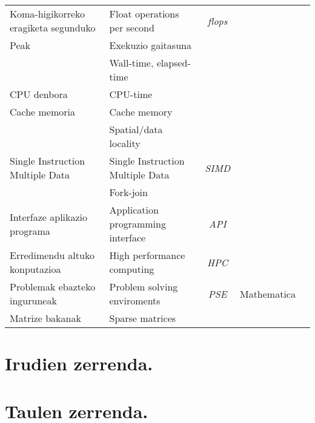 \begin{table}
{\begin{tabular}{ l l c c c }
 Koma-higikorreko eragiketa segunduko    &  Float operations per second         &  \emph{flops}&                  \\   
 Peak                                    &  Exekuzio gaitasuna                   &             &                  \\
                                         &  Wall-time, elapsed-time              &             &                  \\
 CPU denbora                             &  CPU-time                             &             &                  \\
 Cache memoria                           &  Cache memory                         &             &                  \\ 
                                         &  Spatial/data locality                &             &                  \\
 Single Instruction Multiple Data        &  Single Instruction Multiple Data     & \emph{SIMD} &                  \\
                                         &  Fork-join                            &             &                  \\
 Interfaze aplikazio programa            &  Application programming interface    & \emph{API}  &                  \\
 Erredimendu altuko konputazioa          &  High performance computing           & \emph{HPC}  &                  \\
 Problemak ebazteko inguruneak           &  Problem solving enviroments          & \emph{PSE}  & Mathematica      \\
 Matrize bakanak                         &  Sparse matrices                      &             &                  \\
                                                            
 
                                
 \hline
 \end{tabular}}
\end{table}


\newpage
\section*{Irudien zerrenda.}

\listoffigures

\newpage
\section*{Taulen zerrenda.}

\listoftables
\newpage